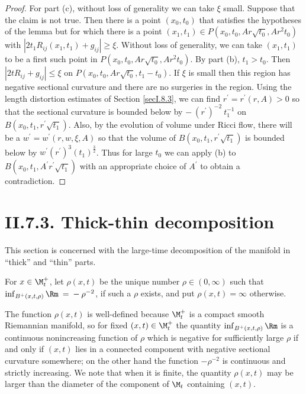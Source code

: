\begin{proof}
For part (c), without loss of generality we can take $\xi$ small.
Suppose that the claim is not true. Then there is a point $(x_0, t_0)$
that satisfies the hypotheses of the lemma but for which there is a point
$\left(x_1, t_1 \right) \in P(x_0, t_0, Ar\sqrt{t_0},
Ar^2 t_0)$ with $|2 t_1 R_{ij}(x_1, t_1) + g_{ij}| \ge \xi$.
Without loss of generality, we can take $(x_1, t_1)$ to be a first
such point in $P(x_0, t_0, Ar\sqrt{t_0}, Ar^2 t_0)$. By part (b),
$t_1 > t_0$. Then $|2 t R_{ij} + g_{ij}| \le \xi$ on
$P(x_0, t_0, Ar\sqrt{t_0}, t_1 -  t_0)$. If $\xi$ is small then this region has
negative sectional curvature and there are no
surgeries in the region. Using the length distortion estimates of
Section \ref{secI.8.3}, we can find
$r^\prime = r^\prime(r, A)>0$ so that the sectional curvature is bounded below
by $- \: (r^\prime)^{-2} \: t_1^{-1}$ on
$B(x_0, t_1, r^\prime \sqrt{t_1})$. Also, by the evolution of volume under
Ricci flow, there will be a $w^\prime =
w^\prime(r, w, \xi, A)$ so that
the volume of   $B(x_0, t_1, r^\prime \sqrt{t_1})$ is bounded below by
$w^\prime (r^\prime)^3 (t_1)^{\frac32}$. Thus for large $t_0$ we can apply
(b) to $B(x_0, t_1, A^\prime r^\prime \sqrt{t_1})$ with an appropriate choice of
$A^\prime$
to obtain a contradiction.
\end{proof}

\section{II.7.3. Thick-thin decomposition}

This section is concerned with the large-time decomposition of the
manifold in ``thick'' and ``thin'' parts.

\begin{definition}
  \label{def:kl-thick-thin-decomposition-curvature-scale}

For $x \in \M_t^+$,
let $\rho(x,t)$ be the unique number $\rho\in (0,\infty)$ such that
$\inf_{B^+(x,t, \rho)} \Rm \: = \: - \: \rho^{-2}$, if such a $\rho$ exists,
and put $\rho(x,t)=\infty$ otherwise.
\end{definition}
The function $\rho(x,t)$ is well-defined because $\M_t^+$ is a compact smooth
Riemannian manifold, so for fixed
$(x,t)\in\M_t^+$ the quantity
$\inf_{B^+(x,t,\rho)} \Rm$
is a continuous nonincreasing function of $\rho$ which is negative
for sufficiently large $\rho$ if and only if $(x,t)$ lies in a connected component
with negative sectional curvature somewhere; on the other hand the function $-\rho^{-2}$ is
continuous and  strictly increasing.  We note that when it is finite,
the quantity $\rho(x,t)$ may be larger than the diameter of the component
of $\M_t$ containing $(x,t)$.

